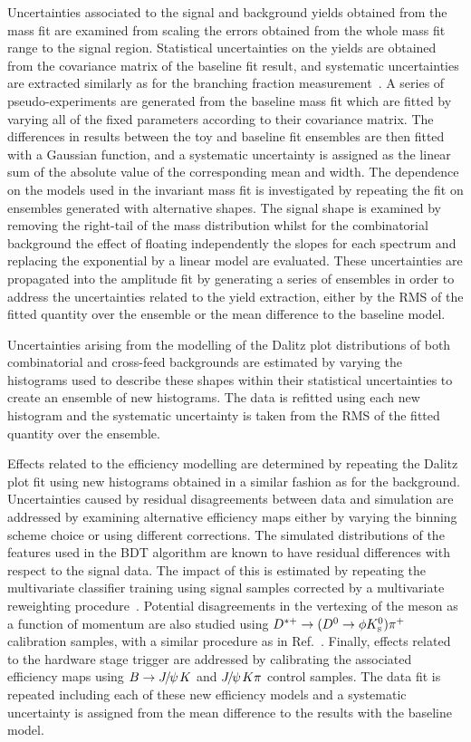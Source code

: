 Uncertainties associated to the signal and background yields obtained from the mass fit are examined from scaling the errors obtained from the whole mass fit range to the signal region. 
Statistical uncertainties on the yields are obtained from the covariance matrix of the baseline fit result, and systematic uncertainties are extracted similarly as for the branching fraction measurement~\cite{LHCb-PAPER-2013-042}.  
A series of pseudo-experiments are generated from the baseline mass fit which are fitted by varying all of the fixed parameters according to their covariance matrix. 
The differences in results between the toy and baseline fit ensembles are then fitted with a Gaussian function, and  
a systematic uncertainty is assigned as the linear sum of the absolute value of the corresponding mean and width. 
The dependence on the models used in the invariant mass fit is investigated by repeating the fit on ensembles generated with alternative shapes. 
The signal shape is examined by removing the right-tail of the mass distribution whilst 
for the combinatorial background the effect of floating independently the slopes for each spectrum and replacing the exponential by a linear model are evaluated.  
These uncertainties are propagated into the amplitude fit by generating a series of ensembles in order to address the uncertainties related to the yield extraction, either by the RMS of the fitted quantity over the ensemble or the mean difference to the baseline model. 

Uncertainties arising from the modelling of the Dalitz plot distributions of both combinatorial and cross-feed backgrounds are estimated 
by varying the histograms used to describe these shapes within their statistical uncertainties to create an ensemble of new histograms.  
The data is refitted using each new histogram and the systematic uncertainty is taken from the RMS of the fitted quantity over the ensemble.

Effects related to the efficiency modelling are determined by repeating the Dalitz plot fit using new histograms obtained in a similar fashion as for the background. 
Uncertainties caused by residual disagreements between data and simulation are addressed by examining 
alternative efficiency maps either by varying the binning scheme choice or using different corrections.
The simulated distributions of the features used in the BDT algorithm are known to have residual differences with respect to the signal data. 
The impact of this is estimated by repeating the multivariate classifier training using 
signal samples corrected by a multivariate reweighting procedure~\cite{Rogozhnikov:2016bdp}.
Potential disagreements in the vertexing of the \KS meson as a function of momentum are also 
studied using $D^{*+}\rightarrow (D^{0}\rightarrow \phi {\ensuremath{{K}^0_{\mathrm{ \scriptscriptstyle S}}}})\pi^{+}$ calibration samples, with a similar procedure 
as in Ref.~\cite{LHCb-PAPER-2012-009}.
Finally, effects related to the hardware stage trigger are addressed
by calibrating the associated efficiency maps using $B \rightarrow {\ensuremath{{J\mskip -3mu/\mskip -2mu\psi\mskip 2mu}}} K$ and ${{J\mskip -3mu/\mskip -2mu\psi\mskip 2mu}} {K}\pi$ control samples.  
The data fit is repeated including each of these new efficiency models and a systematic uncertainty is assigned from the mean difference to the results with the baseline model. 

